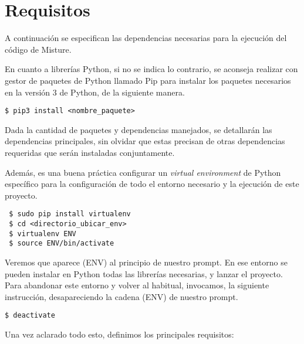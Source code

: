 \cleardoublepage

\chapter{Requisitos}
\label{app:req}

A continuación se especifican las dependencias necesarias para la ejecución del código de Misture.

En cuanto a librerías Python, si no se indica lo contrario, se aconseja realizar con gestor de paquetes de Python llamado Pip para instalar los paquetes necesarios en la versión 3 de Python, de la siguiente manera.
\begin{center}
\begin{verbatim}
$ pip3 install <nombre_paquete>
\end{verbatim}
\end{center}


Dada la cantidad de paquetes y dependencias manejados, se detallarán las dependencias principales, sin olvidar que estas precisan de otras dependencias requeridas que serán instaladas conjuntamente.


Además, es una buena práctica configurar un \textit{virtual environment} de Python específico para la configuración de todo el entorno necesario y la ejecución de este proyecto.
\begin{center}
\begin{verbatim}
 $ sudo pip install virtualenv
 $ cd <directorio_ubicar_env>
 $ virtualenv ENV
 $ source ENV/bin/activate
\end{verbatim}
\end{center}

Veremos que aparece (ENV) al principio de nuestro prompt. En ese entorno se pueden instalar en Python todas las librerías necesarias, y lanzar el proyecto. Para abandonar este entorno y volver al habitual, invocamos, la siguiente instrucción, desapareciendo la cadena (ENV) de nuestro prompt.
\begin{center}
\begin{verbatim}
$ deactivate
\end{verbatim}
\end{center}

Una vez aclarado todo esto, definimos los principales requisitos:

